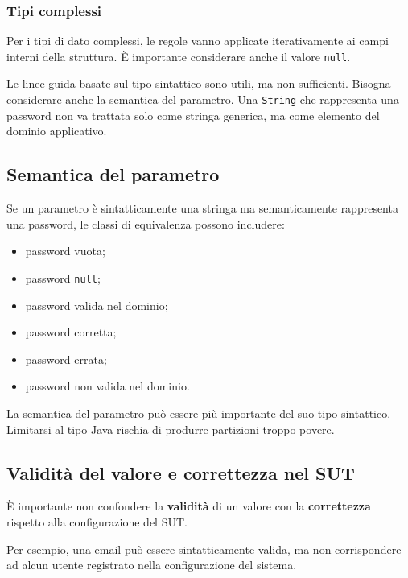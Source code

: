 \subsubsection{Tipi complessi}

Per i tipi di dato complessi, le regole vanno applicate iterativamente ai campi interni della struttura. È importante considerare anche il valore \texttt{null}.

\begin{notaesame}
Le linee guida basate sul tipo sintattico sono utili, ma non sufficienti. Bisogna considerare anche la semantica del parametro. Una \texttt{String} che rappresenta una password non va trattata solo come stringa generica, ma come elemento del dominio applicativo.
\end{notaesame}

\subsection{Semantica del parametro}

Se un parametro è sintatticamente una stringa ma semanticamente rappresenta una password, le classi di equivalenza possono includere:

\begin{itemize}
    \item password vuota;
    \item password \texttt{null};
    \item password valida nel dominio;
    \item password corretta;
    \item password errata;
    \item password non valida nel dominio.
\end{itemize}

\begin{notaprof}
La semantica del parametro può essere più importante del suo tipo sintattico. Limitarsi al tipo Java rischia di produrre partizioni troppo povere.
\end{notaprof}

\subsection{Validità del valore e correttezza nel SUT}

È importante non confondere la \textbf{validità} di un valore con la \textbf{correttezza} rispetto alla configurazione del SUT.

Per esempio, una email può essere sintatticamente valida, ma non corrispondere ad alcun utente registrato nella configurazione del sistema.

